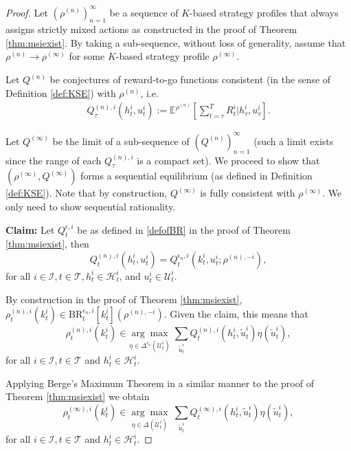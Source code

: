 \documentclass[pdflatex,sn-basic]{sn-jnl}
\newcommand{\E}{\mathbb{E}}
\newcommand{\Qfunc}{Q}
\newcommand{\Comp}{K}
\newcommand{\comp}{k}
\theoremstyle{thmstyleone}%
\theoremstyle{thmstyletwo}%
\theoremstyle{thmstylethree}%
\begin{document}
\begin{appendices}
\begin{proof}
	Let $(\rho^{(n)})_{n=1}^\infty$ be a sequence of $\Comp$-based strategy profiles that always assigns strictly mixed actions as constructed in the proof of Theorem \ref{thm:msiexist}. By taking a sub-sequence, without loss of generality, assume that $\rho^{(n)}\rightarrow \rho^{(\infty)}$ for some $\Comp$-based strategy profile $\rho^{(\infty)}$. 
	
	Let $\Qfunc^{(n)}$ be conjectures of reward-to-go functions consistent (in the sense of Definition \ref{def:KSE}) with $\rho^{(n)}$, i.e.
	\begin{align}
		\Qfunc_\tau^{(n), i}(h_t^i, u_t^i) := \E^{\rho^{(n)}}\left[\sum_{t=\tau}^T R_t^i\Big|h_\tau^i, u_\tau^i\right].
	\end{align}
	
	Let $\Qfunc^{(\infty)}$ be the limit of a sub-sequence of $(\Qfunc^{(n)})_{n=1}^\infty$ (such a limit exists since the range of each $\Qfunc_\tau^{(n), i}$ is a compact set). We proceed to show that $(\rho^{(\infty)}, \Qfunc^{(\infty)})$ forms a sequential equilibrium (as defined in Definition \ref{def:KSE}). Note that by construction, $\Qfunc^{(\infty)}$ is fully consistent with $\rho^{(\infty)}$. We only need to show sequential rationality.
	
	\textbf{Claim:} Let $\Qfunc_t^{\epsilon, i}$ be as defined in \eqref{defofBR} in the proof of Theorem \ref{thm:msiexist}, then
	\begin{equation}
		\Qfunc_t^{(n), i}(h_t^i, u_t^i) = \Qfunc_t^{\epsilon_n, i}(\comp_{t}^i, u_t^i; \rho^{(n), -i}),
	\end{equation}
	for all $i\in\mathcal{I}, t\in\mathcal{T}, h_t^i\in\mathcal{H}_t^i$, and $u_t^i\in\mathcal{U}_t^i$.
	
	By construction in the proof of Theorem \ref{thm:msiexist}, $\rho_t^{(n), i}(\comp_t^i)\in \mathrm{BR}_t^{\epsilon_n, i}[\comp_t^i](\rho^{(n), -i})$. Given the claim, this means that
	\begin{equation}
		\rho_{t}^{(n), i}(\comp_t^i) \in \underset{\eta\in \Delta^{\epsilon_n}(\mathcal{U}_{t}^{i}) }{\arg\max}~\sum_{\tilde{u}_{t}^i} \Qfunc_t^{(n), i}(h_{t}^i, \tilde{u}_{t}^i) \eta(\tilde{u}_{t}^i),
	\end{equation}
	for all $i\in\mathcal{I}, t\in \mathcal{T}$ and $h_{t}^i\in \mathcal{H}_{t}^i$.
	
	Applying Berge's Maximum Theorem \citep{sundaram1996first} in a similar manner to the proof of Theorem \ref{thm:msiexist} we obtain
	\begin{equation}
		\rho_{t}^{(\infty), i}(\comp_t^i) \in \underset{\eta\in \Delta(\mathcal{U}_{t}^{i}) }{\arg\max}~\sum_{\tilde{u}_{t}^i} \Qfunc_t^{(\infty), i}(h_{t}^i, \tilde{u}_{t}^i) \eta(\tilde{u}_{t}^i),
	\end{equation}
	for all $i\in\mathcal{I}, t\in \mathcal{T}$ and $h_{t}^i\in \mathcal{H}_{t}^i$. 
	

\end{proof}
\end{appendices}
\end{document}
